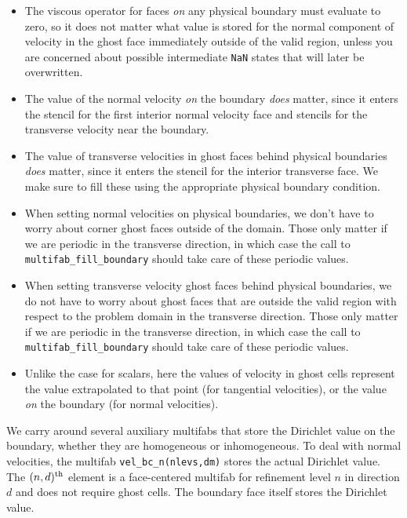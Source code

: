 \documentclass[final]{siamltex}
\begin{document}
\begin{itemize}
\item The viscous operator for faces {\it on} any physical boundary must
evaluate to zero, so it does not matter what value is stored for the normal component
of velocity in the ghost face immediately outside of the valid region, unless you 
are concerned 
about possible intermediate {\tt NaN} states that will later be overwritten.\\
\item The value of the normal velocity {\it on} the boundary {\it does} matter, since it
enters the stencil for the first interior normal velocity face and stencils for the
transverse velocity near the boundary.\\
\item The value of transverse velocities in ghost faces behind physical boundaries
{\it does} matter, since it enters the stencil for the interior transverse face.
We make sure to fill these using the appropriate physical boundary condition.\\
\item When setting normal velocities on physical boundaries, we don't have to worry
about corner ghost faces outside of the domain.  Those only matter if we are periodic 
in the transverse
direction, in which case the call to {\tt multifab\_fill\_boundary} should take care of
these periodic values.\\
\item When setting transverse velocity ghost faces behind physical boundaries, we do
not have to worry about ghost faces that are outside the valid region with respect
to the problem domain in the transverse direction.  Those only matter if we are 
periodic in the transverse direction, in which case the call to {\tt multifab\_fill\_boundary}
should take care of these periodic values.\\
\item Unlike the case for scalars, here the values of velocity in ghost cells represent
the value extrapolated to that point (for tangential velocities), or the value {\it on}
the boundary (for normal velocities).
\end{itemize}

We carry around several auxiliary multifabs that store the Dirichlet value on the
boundary, whether they are homogeneous or inhomogeneous.  To deal with normal 
velocities, the multifab {\tt vel\_bc\_n(nlevs,dm)}
stores the actual Dirichlet value.  The $(n,d)^{\rm th}$ element is a face-centered
multifab for refinement level $n$ in direction $d$ and does not require ghost cells.
The boundary face itself stores the Dirichlet value.\\
\end{document}
